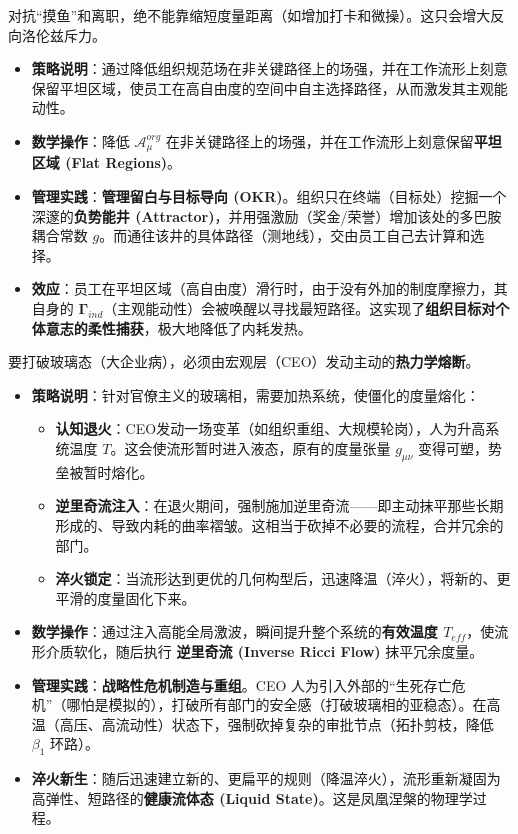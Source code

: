 
对抗“摸鱼”和离职，绝不能靠缩短度量距离（如增加打卡和微操）。这只会增大反向洛伦兹斥力。
\begin{itemize}
    \item \textbf{策略说明}：通过降低组织规范场在非关键路径上的场强，并在工作流形上刻意保留平坦区域，使员工在高自由度的空间中自主选择路径，从而激发其主观能动性。
    \item \textbf{数学操作}：降低 $\mathcal{A}_\mu^{org}$ 在非关键路径上的场强，并在工作流形上刻意保留\textbf{平坦区域 (Flat Regions)}。
    \item \textbf{管理实践}：\textbf{管理留白与目标导向 (OKR)}。组织只在终端（目标处）挖掘一个深邃的\textbf{负势能井 (Attractor)}，并用强激励（奖金/荣誉）增加该处的多巴胺耦合常数 $g$。而通往该井的具体路径（测地线），交由员工自己去计算和选择。
    \item \textbf{效应}：员工在平坦区域（高自由度）滑行时，由于没有外加的制度摩擦力，其自身的 $\mathbf{\Gamma}_{ind}$（主观能动性）会被唤醒以寻找最短路径。这实现了\textbf{组织目标对个体意志的柔性捕获}，极大地降低了内耗发热。
\end{itemize}


要打破玻璃态（大企业病），必须由宏观层（CEO）发动主动的\textbf{热力学熔断}。
\begin{itemize}
    \item \textbf{策略说明}：针对官僚主义的玻璃相，需要加热系统，使僵化的度量熔化：
    \begin{itemize}
        \item \textbf{认知退火}：CEO发动一场变革（如组织重组、大规模轮岗），人为升高系统温度 $T$。这会使流形暂时进入液态，原有的度量张量 $g_{\mu\nu}$ 变得可塑，势垒被暂时熔化。
        \item \textbf{逆里奇流注入}：在退火期间，强制施加逆里奇流——即主动抹平那些长期形成的、导致内耗的曲率褶皱。这相当于砍掉不必要的流程，合并冗余的部门。
        \item \textbf{淬火锁定}：当流形达到更优的几何构型后，迅速降温（淬火），将新的、更平滑的度量固化下来。
    \end{itemize}
    \item \textbf{数学操作}：通过注入高能全局激波，瞬间提升整个系统的\textbf{有效温度 $T_{eff}$}，使流形介质软化，随后执行 \textbf{逆里奇流 (Inverse Ricci Flow)} 抹平冗余度量。
    \item \textbf{管理实践}：\textbf{战略性危机制造与重组}。CEO 人为引入外部的“生死存亡危机”（哪怕是模拟的），打破所有部门的安全感（打破玻璃相的亚稳态）。在高温（高压、高流动性）状态下，强制砍掉复杂的审批节点（拓扑剪枝，降低 $\beta_1$ 环路）。
    \item \textbf{淬火新生}：随后迅速建立新的、更扁平的规则（降温淬火），流形重新凝固为高弹性、短路径的\textbf{健康流体态 (Liquid State)}。这是凤凰涅槃的物理学过程。
\end{itemize}


